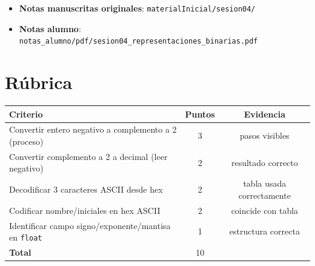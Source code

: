 \documentclass[12pt, oneside]{article}
\begin{document}
\begin{itemize}
  \item \textbf{Notas manuscritas originales}: \texttt{materialInicial/sesion04/}
  \item \textbf{Notas alumno}: \texttt{notas\_alumno/pdf/sesion04\_representaciones\_binarias.pdf}
\end{itemize}

\section{Rúbrica}

\begin{center}
\begin{tabular}{lcc}
  \toprule
  \textbf{Criterio} & \textbf{Puntos} & \textbf{Evidencia} \\
  \midrule
  Convertir entero negativo a complemento a 2 (proceso) & 3 & pasos visibles \\
  Convertir complemento a 2 a decimal (leer negativo)   & 2 & resultado correcto \\
  Decodificar 3 caracteres ASCII desde hex               & 2 & tabla usada correctamente \\
  Codificar nombre/iniciales en hex ASCII                & 2 & coincide con tabla \\
  Identificar campo signo/exponente/mantisa en \texttt{float} & 1 & estructura correcta \\
  \bottomrule
  \textbf{Total} & 10 & \\
\end{tabular}
\end{center}
\end{document}
